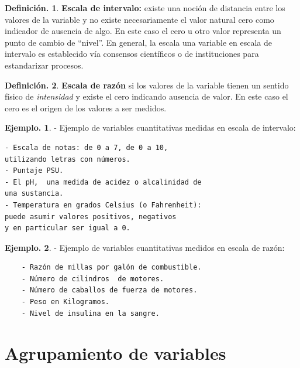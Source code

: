 \documentclass[]{book}
\theoremstyle{definition}
\newtheorem{definition}{Definición.}[chapter]
\theoremstyle{definition}
\newtheorem{example}{Ejemplo.}[chapter]
\theoremstyle{definition}
\theoremstyle{remark}
\begin{document}
\begin{definition}
\protect\hypertarget{def:unnamed-chunk-31}{}{\label{def:unnamed-chunk-31} }\textbf{Escala de intervalo:} existe una noción de distancia
entre los valores de la variable y no
existe necesariamente el valor natural cero como
indicador de ausencia de algo. En este caso el
cero u otro valor representa un punto de cambio de
``nivel''. En general, la escala una variable en
escala de intervalo es establecido vía consensos
científicos o de instituciones para estandarizar
procesos.
\end{definition}

\begin{definition}
\protect\hypertarget{def:unnamed-chunk-32}{}{\label{def:unnamed-chunk-32} }\textbf{Escala de razón} si los valores de la variable tienen
un sentido físico de \emph{intensidad} y
existe el cero indicando ausencia de valor. En este caso
el cero es el origen de los valores a ser
medidos.\\
\end{definition}

\begin{example}
\protect\hypertarget{exm:unnamed-chunk-33}{}{\label{exm:unnamed-chunk-33} }- Ejemplo de variables cuantitativas medidas en escala de
intervalo:

\begin{verbatim}
- Escala de notas: de 0 a 7, de 0 a 10,
utilizando letras con números. 
- Puntaje PSU.
- El pH,  una medida de acidez o alcalinidad de 
una sustancia.
- Temperatura en grados Celsius (o Fahrenheit):
puede asumir valores positivos, negativos
y en particular ser igual a 0.
\end{verbatim}
\end{example}

\begin{example}
\protect\hypertarget{exm:unnamed-chunk-34}{}{\label{exm:unnamed-chunk-34} }- Ejemplo de variables cuantitativas medidos en escala de
razón:

\begin{verbatim}
    - Razón de millas por galón de combustible. 
    - Número de cilindros  de motores.
    - Número de caballos de fuerza de motores.
    - Peso en Kilogramos.
    - Nivel de insulina en la sangre.
\end{verbatim}
\end{example}

\hypertarget{agrupamiento-de-variables}{%
\section{Agrupamiento de variables}\label{agrupamiento-de-variables}}
\end{document}

